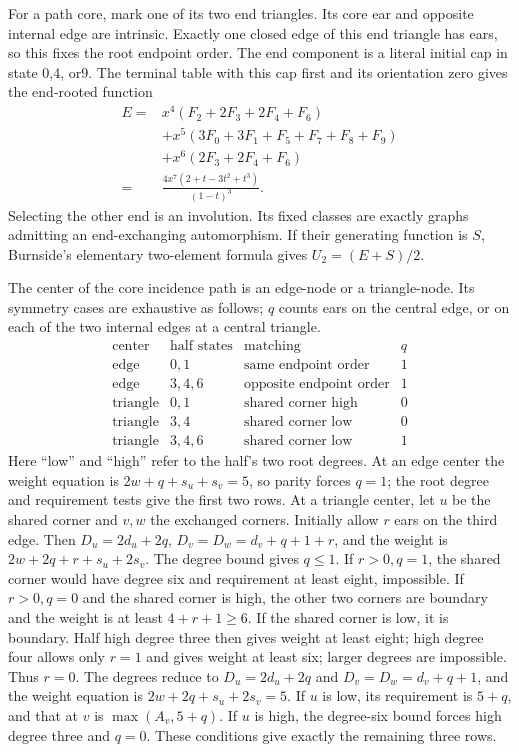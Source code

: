 For a path core, mark one of its two end triangles.  Its core
ear and opposite internal edge are intrinsic.  Exactly one
closed edge of this end triangle has ears, so this fixes the
root endpoint order.  The end component is a literal initial
cap in state 0,4, or9.  The terminal table with this cap first
and its orientation zero gives the end-rooted function
\begin{align*}
 E={}&x^4(F_2+2F_3+2F_4+F_6)\\
 &+x^5(3F_0+3F_1+F_5+F_7+F_8+F_9)\\
 &+x^6(2F_3+2F_4+F_6)\\
 ={}&\frac{4x^7(2+t-3t^2+t^3)}{(1-t)^3}.
\end{align*}
Selecting the other end is an involution.  Its fixed classes
are exactly graphs admitting an end-exchanging automorphism.
If their generating function is $S$, Burnside's elementary
two-element formula gives $U_2=(E+S)/2$.

The center of the core incidence path is an edge-node or a
triangle-node.  Its symmetry cases are exhaustive as follows;
$q$ counts ears on the central edge, or on each of the two
internal edges at a central triangle.
\[
\begin{array}{c|c|l|c}
\text{center}&\text{half states}&\text{matching}&q\\ \hline
\text{edge}&0,1&\text{same endpoint order}&1\\
\text{edge}&3,4,6&\text{opposite endpoint order}&1\\
\text{triangle}&0,1&\text{shared corner high}&0\\
\text{triangle}&3,4&\text{shared corner low}&0\\
\text{triangle}&3,4,6&\text{shared corner low}&1
\end{array}
\]
Here ``low'' and ``high'' refer to the half's two root degrees.
At an edge center the weight equation is
$2w+q+s_u+s_v=5$, so parity forces $q=1$; the root degree and
requirement tests give the first two rows.  At a triangle
center, let $u$ be the shared corner and $v,w$ the exchanged
corners.  Initially allow $r$ ears on the third edge.  Then
$D_u=2d_u+2q$, $D_v=D_w=d_v+q+1+r$, and the weight is
$2w+2q+r+s_u+2s_v$.  The degree bound gives $q\le1$.
If $r>0,q=1$, the shared corner would have degree six and
requirement at least eight, impossible.  If $r>0,q=0$ and
the shared corner is high, the other two corners are boundary
and the weight is at least $4+r+1\ge6$.  If the shared corner
is low, it is boundary.  Half high degree three then gives
weight at least eight; high degree four allows only $r=1$
and gives weight at least six; larger degrees are impossible.
Thus $r=0$.  The degrees reduce to
$D_u=2d_u+2q$ and $D_v=D_w=d_v+q+1$, and the weight equation is
$2w+2q+s_u+2s_v=5$.  If $u$ is low, its requirement is $5+q$,
and that at $v$ is $\max(A_v,5+q)$.  If $u$ is high, the
degree-six bound forces high degree three and $q=0$.  These
conditions give exactly the remaining three rows.


